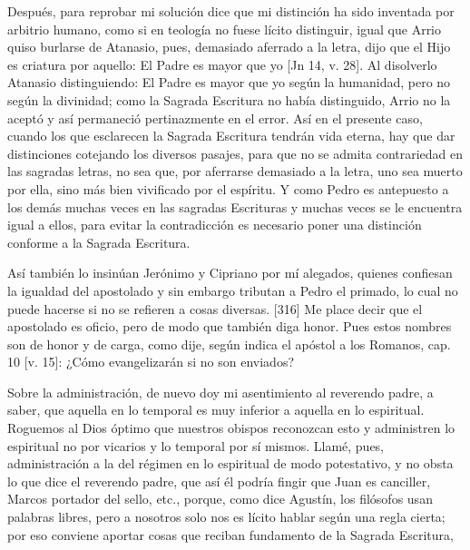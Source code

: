 Después, para reprobar mi solución dice que mi distinción ha sido inventada por arbitrio humano, como si en teología no fuese lícito distinguir, igual que Arrio quiso burlarse de Atanasio, pues, demasiado aferrado a la letra, dijo que el Hijo es criatura por aquello: El Padre es mayor que yo [Jn 14, v. 28]. Al disolverlo Atanasio distinguiendo: El Padre es mayor que yo según la humanidad, pero no según la divinidad; como la Sagrada Escritura no había distinguido, Arrio no la aceptó y así permaneció pertinazmente en el error. Así en el presente caso, cuando los que esclarecen la Sagrada Escritura tendrán vida eterna, hay que dar distinciones cotejando los diversos pasajes, para que no se admita contrariedad en las sagradas letras, no sea que, por aferrarse demasiado a la letra, uno sea muerto por ella, sino más bien vivificado por el espíritu. Y como Pedro es antepuesto a los demás muchas veces en las sagradas Escrituras y muchas veces se le encuentra igual a ellos, para evitar la contradicción es necesario poner una distinción conforme a la Sagrada Escritura.

Así también lo insinúan Jerónimo y Cipriano por mí alegados, quienes confiesan la igualdad del apostolado y sin embargo tributan a Pedro el primado, lo cual no puede hacerse si no se refieren a cosas diversas. [316] Me place decir que el apostolado es oficio, pero de modo que también diga honor. Pues estos nombres son de honor y de carga, como dije, según indica el apóstol a los Romanos, cap. 10 [v. 15]: ¿Cómo evangelizarán si no son enviados?

Sobre la administración, de nuevo doy mi asentimiento al reverendo padre, a saber, que aquella en lo temporal es muy inferior a aquella en lo espiritual. Roguemos al Dios óptimo que nuestros obispos reconozcan esto y administren lo espiritual no por vicarios y lo temporal por sí mismos. Llamé, pues, administración a la del régimen en lo espiritual de modo potestativo, y no obsta lo que dice el reverendo padre, que así él podría fingir que Juan es canciller, Marcos portador del sello, etc., porque, como dice Agustín, los filósofos usan palabras libres, pero a nosotros solo nos es lícito hablar según una regla cierta; por eso conviene aportar cosas que reciban fundamento de la Sagrada Escritura,

